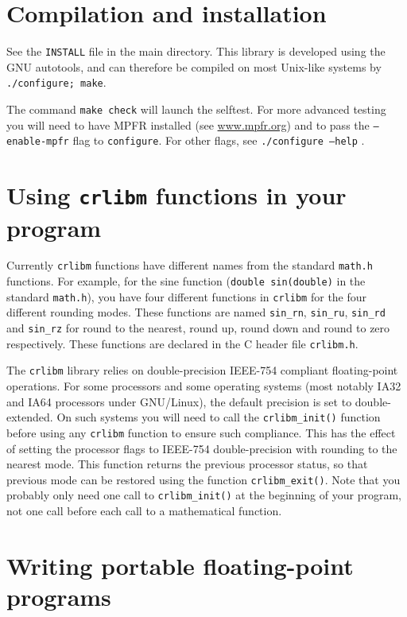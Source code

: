 \section{Compilation and installation}
See the \texttt{INSTALL} file in the main directory. This library is
developed using the GNU autotools, and can therefore be compiled on
most Unix-like systems by \texttt{./configure; make}. 


The command \texttt{make check} will launch the selftest.
For more advanced testing you will need to have MPFR installed (see
\url{www.mpfr.org}) and to pass the \texttt{--enable-mpfr} flag to
\texttt{configure}. For other flags, see \texttt{./configure --help} .

\section{Using \texttt{crlibm} functions in your program}

Currently \texttt{crlibm} functions have different names from the
standard \texttt{math.h} functions. For example, for the sine function
(\texttt{double sin(double)} in the standard \texttt{math.h}), you
have four different functions in \texttt{crlibm} for the four
different rounding modes. These functions are named \texttt{sin\_rn},
\texttt{sin\_ru}, \texttt{sin\_rd} and \texttt{sin\_rz} for round to the
nearest, round up, round down and round to zero respectively. These
functions are declared in the C header file \texttt{crlibm.h}.

The \texttt{crlibm} library relies on double-precision IEEE-754
compliant floating-point operations.  For some processors and some
operating systems (most notably IA32 and IA64 processors under
GNU/Linux), the default precision is set to double-extended.  On such
systems you will need to call the \texttt{crlibm\_init()} function
before using any \texttt{crlibm} function to ensure such compliance.
This has the effect of setting the processor flags to IEEE-754
double-precision with rounding to the nearest mode.  This function
returns the previous processor status, so that previous mode can be
restored using the function \texttt{crlibm\_exit()}. Note that you
probably only need one call to \texttt{crlibm\_init()} at the beginning
of your program, not one call before each call to a mathematical
function.


\section{Writing portable floating-point programs}

